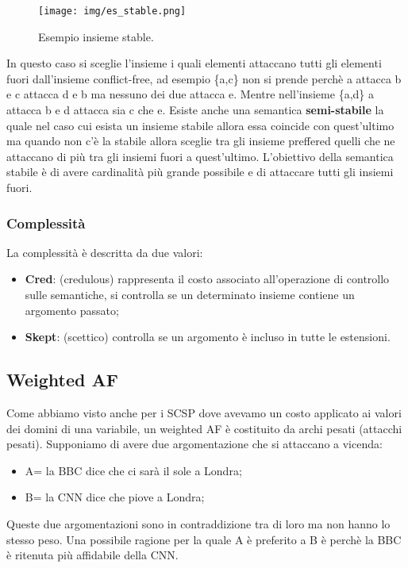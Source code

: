 \begin{figure}[H]
    \centering
    \texttt{[image: img/es\_stable.png]}
    \caption{Esempio insieme stable.}\label{fig:es_insieme_stable}
\end{figure}
In questo caso si sceglie l'insieme i quali elementi attaccano tutti gli elementi fuori dall'insieme conflict-free, ad esempio \{a,c\} non si prende perchè a attacca b e c attacca d e b ma nessuno dei due attacca e. Mentre nell'insieme \{a,d\} a attacca b e d attacca sia c che e. Esiste anche una semantica \textbf{semi-stabile} la quale nel caso cui esista un insieme stabile allora essa coincide con quest'ultimo ma quando non c'è la stabile allora sceglie tra gli insieme preffered quelli che ne attaccano di più tra gli insiemi fuori a quest'ultimo. L'obiettivo della semantica stabile è di avere  cardinalità più grande possibile e di attaccare tutti gli insiemi fuori.

\subsubsection{Complessità}
La complessità è descritta da due valori:
\begin{itemize}
    \item \textbf{Cred}: (credulous) rappresenta il costo associato all'operazione di controllo sulle semantiche, si controlla se un determinato insieme contiene un argomento passato;
    \item \textbf{Skept}: (scettico) controlla se un argomento è incluso in tutte le estensioni.
\end{itemize}

\subsection{Weighted AF}
Come abbiamo visto anche per i SCSP dove avevamo un costo applicato ai valori dei domini di una variabile, un weighted AF è costituito da archi pesati (attacchi pesati). Supponiamo di avere due argomentazione che si attaccano a vicenda:
\begin{itemize}
    \item A= la BBC dice che ci sarà il sole a Londra;
    \item B= la CNN dice che piove a Londra;
\end{itemize}
Queste due argomentazioni sono in contraddizione tra di loro ma non hanno lo stesso peso. Una possibile ragione per la quale  A è preferito a B è perchè la BBC è ritenuta più affidabile della CNN.

